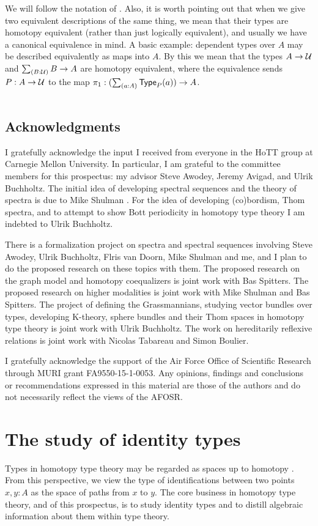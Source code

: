 \documentclass[reqno]{amsart}
\begin{document}
We will follow the notation of \cite{hottbook}.
Also, it is worth pointing out that when we give two equivalent descriptions
of the same thing, we mean that their types are homotopy equivalent
(rather than just logically equivalent), and usually
we have a canonical equivalence in mind. A basic
example: dependent types over $A$ may be described equivalently as maps into
$A$. By this we mean that the types $A\to\mathcal{U}$ and $\sm{B:\UU}B\to A$ are 
homotopy equivalent, where the equivalence sends $P:A\to\mathcal{U}$ to the map
$\pi_1:(\sm{a:A}\P(a))\to A$.

\begin{tabular}{rr}
\end{tabular}

\subsection{Acknowledgments}
I gratefully acknowledge the input I received from everyone in the HoTT group at Carnegie Mellon University. In particular, I am grateful to the committee members for this prospectus: my advisor Steve Awodey, Jeremy Avigad, and Ulrik Buchholtz. The initial idea of developing spectral sequences and the theory of spectra is due to Mike Shulman \cite{Shulman13Spectral}. For the idea of developing (co)bordism, Thom spectra, and to attempt to show Bott periodicity in homotopy type theory I am indebted to Ulrik Buchholtz. 

There is a formalization project on spectra and spectral sequences involving Steve Awodey, Ulrik Buchholtz, Flris van Doorn, Mike Shulman and me, and I plan to do the proposed research on these topics with them.
The proposed research on the graph model and homotopy coequalizers is joint work with Bas Spitters. The proposed research on higher modalities is joint work with Mike Shulman and Bas Spitters. The project of defining the Grassmannians, studying vector bundles over types, developing K-theory, sphere bundles and their Thom spaces in homotopy type theory is joint work with Ulrik Buchholtz. The work on hereditarily reflexive relations is joint work with Nicolas Tabareau and Simon Boulier.

I gratefully acknowledge the support of the Air Force Office of Scientific Research through MURI grant FA9550-15-1-0053. Any opinions, findings and conclusions or recommendations expressed in this material are those of the authors and do not necessarily reflect the views of the AFOSR.

\section{The study of identity types}
Types in homotopy type theory may be regarded as spaces up to homotopy \cite{AwodeyWarren,KapulkinLeFanuLumsdaine}. 
From this perspective, we view the type of identifications between two points
$x,y:A$ as the space of paths from $x$ to $y$.
The core business in homotopy type theory, and of this prospectus, 
is to study identity types and to distill algebraic information about them
within type theory. 
\end{document}
